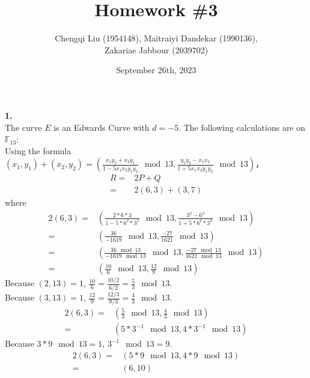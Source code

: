 \documentclass[
12pt, %
]{fphw}
\title{Homework \#3} %
\author{Chengqi Liu (1954148), Maitraiyi Dandekar (1990136),\\ Zakariae Jabbour (2039702)} %
\date{September 26th, 2023} %
\institute{Eindhoven University of Technology} %
\begin{document}
\maketitle %

\textbf{1.\\}
The curve $E$ is an Edwards Curve with $d=-5$. The following calculations are on $\mathbb{F}_{13}$:\\
Using the formula $(x_1,y_1)+(x_2,y_2)=(\frac{x_1y_2+x_2y_1}{1-5x_1x_2y_1y_2} \mod 13,\frac{y_1y_2-x_1x_2}{1+5x_1x_2y_1y_2}\mod 13)$，
\begin{align*}
	R=&2P+Q\\
	=&2(6,3)+(3,7)
\end{align*}
where
\begin{align*}
	2(6,3)=&(\frac{2*6*3}{1-5*6^2*3^2}\mod 13,\frac{3^2-6^2}{1+5*6^2*3^2} \mod 13)\\
	=&(\frac{36}{-1619}\mod 13,\frac{-27}{1621} \mod 13)\\
	=&(\frac{36\mod 13}{-1619\mod 13}\mod 13,\frac{-27\mod 13}{1621\mod 13} \mod 13)\\
	=&(\frac{10}{6}\mod 13,\frac{12}{9} \mod 13)
\end{align*}
Because $(2,13)=1$, $\frac{10}{6}=\frac{10/2}{6/2}=\frac{5}{3}\mod 13$.\\
Because $(3,13)=1$, $\frac{12}{9}=\frac{12/3}{9/3}=\frac{4}{3}\mod 13$. 
\begin{align*}
	2(6,3)=&(\frac{5}{3}\mod 13, \frac{4}{3}\mod 13)\\
	=&(5*3^{-1}\mod 13, 4*3^{-1} \mod 13)
\end{align*}
Because $3*9\mod 13=1$, $3^{-1}\mod13=9$.
\begin{align*}
	2(6,3)=&(5*9 \mod13,4*9\mod13)\\
	=&(6,10)
\end{align*}
\end{document}
